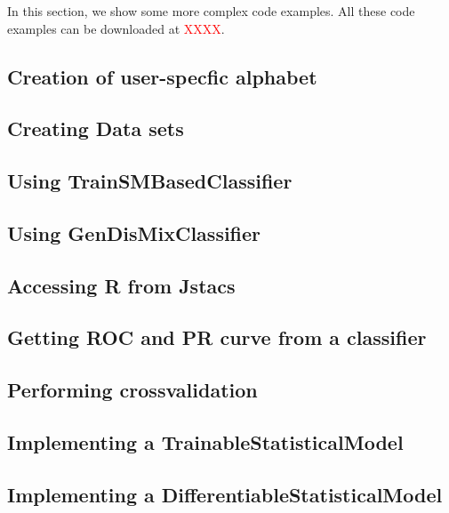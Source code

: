 In this section, we show some more complex code examples. All these code examples can be downloaded at \textcolor{red}{XXXX}.

\subsection{Creation of user-specfic alphabet}
\renewcommand{\codefile}{./recipes/AlphabetCreation.java}
\setcounter{off}{33}

\subsection{Creating Data sets}
\renewcommand{\codefile}{./recipes/DataLoader.java}
\setcounter{off}{42}

\subsection{Using TrainSMBasedClassifier}
\renewcommand{\codefile}{./recipes/TrainSMBasedClassifierTest.java}
\setcounter{off}{53}

\subsection{Using GenDisMixClassifier}
\renewcommand{\codefile}{./recipes/GenDisMixClassifierTest.java}
\setcounter{off}{54}

\subsection{Accessing R from Jstacs}
\renewcommand{\codefile}{./recipes/RserveTest.java}
\setcounter{off}{40}

\subsection{Getting ROC and PR curve from a classifier}
\renewcommand{\codefile}{./recipes/CurvePlotter.java}
\setcounter{off}{53}

\subsection{Performing crossvalidation}
\renewcommand{\codefile}{./recipes/Crossvalidation.java}
\setcounter{off}{62}

\subsection{Implementing a TrainableStatisticalModel}
\renewcommand{\codefile}{../codeExamples/HomogeneousMarkovModel.java}
\setcounter{off}{35}

\subsection{Implementing a DifferentiableStatisticalModel}
\renewcommand{\codefile}{../codeExamples/PositionWeightMatrixDiffSM.java}
\setcounter{off}{18}
